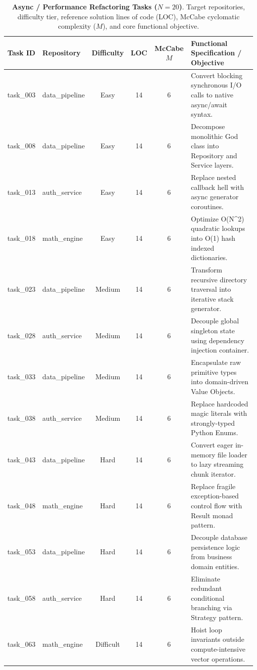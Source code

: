 \begin{table}[t]
\centering
\scriptsize
\caption{\textbf{Async / Performance Refactoring Tasks ($N=20$)}. Target repositories, difficulty tier, reference solution lines of code (LOC), McCabe cyclomatic complexity ($M$), and core functional objective.}
\label{tab:tasks_refactor}
\begin{tabular}{llcccl}
\toprule
\textbf{Task ID} & \textbf{Repository} & \textbf{Difficulty} & \textbf{LOC} & \textbf{McCabe $M$} & \textbf{Functional Specification / Objective} \\
\midrule
task\_003 & data\_pipeline & Easy & 14 & 6 & Convert blocking synchronous I/O calls to native async/await syntax. \\
task\_008 & data\_pipeline & Easy & 14 & 6 & Decompose monolithic God class into Repository and Service layers. \\
task\_013 & auth\_service & Easy & 14 & 6 & Replace nested callback hell with async generator coroutines. \\
task\_018 & math\_engine & Easy & 14 & 6 & Optimize O(N^2) quadratic lookups into O(1) hash indexed dictionaries. \\
task\_023 & data\_pipeline & Medium & 14 & 6 & Transform recursive directory traversal into iterative stack generator. \\
task\_028 & auth\_service & Medium & 14 & 6 & Decouple global singleton state using dependency injection container. \\
task\_033 & data\_pipeline & Medium & 14 & 6 & Encapsulate raw primitive types into domain-driven Value Objects. \\
task\_038 & auth\_service & Medium & 14 & 6 & Replace hardcoded magic literals with strongly-typed Python Enums. \\
task\_043 & data\_pipeline & Hard & 14 & 6 & Convert eager in-memory file loader to lazy streaming chunk iterator. \\
task\_048 & math\_engine & Hard & 14 & 6 & Replace fragile exception-based control flow with Result monad pattern. \\
task\_053 & data\_pipeline & Hard & 14 & 6 & Decouple database persistence logic from business domain entities. \\
task\_058 & auth\_service & Hard & 14 & 6 & Eliminate redundant conditional branching via Strategy pattern. \\
task\_063 & math\_engine & Difficult & 14 & 6 & Hoist loop invariants outside compute-intensive vector operations. \\

\end{tabular}
\end{table}

